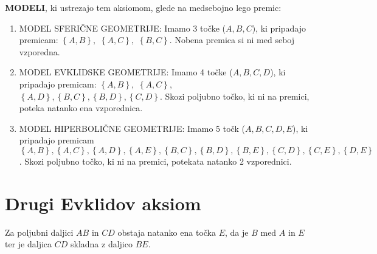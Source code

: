     \noindent \textbf{MODELI}, ki ustrezajo tem aksiomom, glede na medsebojno lego premic:
    \begin{enumerate}
        \item MODEL SFERIČNE GEOMETRIJE: Imamo 3 točke ($A, B, C$), ki pripadajo premicam: $\left\{A, B\right\},$ $\left\{A, C\right\},$ $\left\{B, C\right\}$. Nobena premica si ni med seboj vzporedna.
        \item MODEL EVKLIDSKE GEOMETRIJE: Imamo 4 točke ($A, B, C, D$), ki pripadajo premicam: $\left\{A,B\right\},$ $\left\{A,C\right\},$ $\left\{A,D\right\}, \left\{B,C\right\}, \left\{B,D\right\}, \left\{C,D\right\}$. Skozi poljubno točko, ki ni na premici, poteka natanko ena vzporednica.
        \item MODEL HIPERBOLIČNE GEOMETRIJE: Imamo 5 točk ($A, B, C, D, E$), ki pripadajo premicam $\left\{A,B\right\},\left\{A,C\right\},\left\{A,D\right\},\left\{A,E\right\},\left\{B,C\right\},\left\{B,D\right\},\left\{B,E\right\},\left\{C,D\right\},\left\{C,E\right\},\left\{D,E\right\}$. Skozi poljubno točko, ki ni na premici, potekata natanko 2 vzporednici.
    \end{enumerate}

\section*{Drugi Evklidov aksiom}

    \begin{aksiom}[E.2]
        Za poljubni daljici $AB$ in $CD$ obstaja natanko ena točka $E$, da je $B$ med $A$ in $E$ ter je daljica $CD$ skladna z daljico $BE$.
    \end{aksiom}

